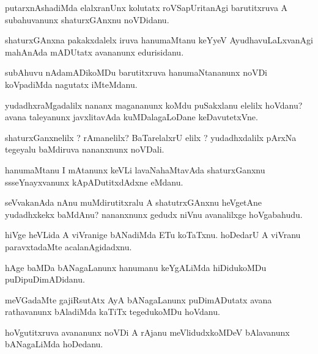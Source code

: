 \documentclass{article}
\begin{document}
\begin{mn}%
putarxnAshadiMda elalxranUnx kolutatx roVSapUritanAgi barutitxruva A subahuvanunx 
shaturxGAnxnu noVDidanu.
\end{mn}

\begin{mn}%
shaturxGAnxna pakakxdalelx iruva hanumaMtanu keYyeV AyudhavuLaLxvanAgi mahAnAda mADUtatx 
avananunx edurisidanu.
\end{mn}

\begin{mn}%
subAhuvu nAdamADikoMDu barutitxruva hanumaNtananunx noVDi koVpadiMda nagutatx iMteMdanu.
\end{mn}

\begin{mn}%
yudadhxraMgadalilx nananx magananunx koMdu puSakxlanu elelilx hoVdanu? avana taleyanunx 
javxlitavAda kuMDalagaLoDane keDavutetxVne.
\end{mn}

\begin{mn}%
shaturxGanxnelilx ? rAmanelilx? BaTarelalxrU elilx ? yudadhxdalilx pArxNa tegeyalu 
baMdiruva nananxnunx noVDali.
\end{mn}

\begin{mn}%
hanumaMtanu I mAtanunx keVLi lavaNahaMtavAda shaturxGanxnu ssseYnayxvanunx 
kApADutitxdAdxne eMdanu.
\end{mn}

\begin{mn}%
seVvakanAda nAnu muMdirutitxralu A shatutrxGAnxnu heVgetAne yudadhxkekx baMdAnu? nananxnunx 
gedudx niVnu avanalilxge hoVgabahudu.
\end{mn}

\begin{mn}%
hiVge heVLida A viVranige bANadiMda ETu koTaTxnu. hoDedarU A viVranu paravxtadaMte 
acalanAgidadxnu.
\end{mn}

\begin{mn}%
hAge baMDa bANagaLanunx hanumanu keYgALiMda hiDidukoMDu puDipuDimADidanu.
\end{mn}

\begin{mn}%
meVGadaMte gajiRsutAtx AyA bANagaLanunx puDimADutatx avana rathavanunx bAladiMda kaTiTx 
tegedukoMDu hoVdanu.
\end{mn}

\begin{mn}%
hoVgutitxruva avananunx noVDi A rAjanu meVlidudxkoMDeV bAlavanunx bANagaLiMda hoDedanu.
\end{mn}
\end{document}
